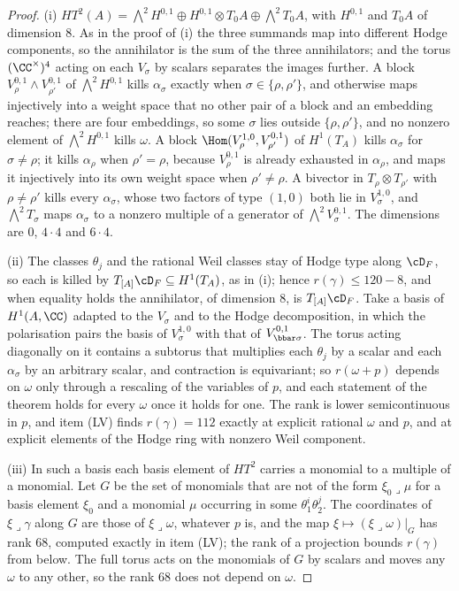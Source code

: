 \begin{proof}
(i) $HT^{2}(A)=\bigwedge^{2}H^{0,1}\oplus H^{0,1}\otimes T_{0}A\oplus
\bigwedge^{2}T_{0}A$, with $H^{0,1}$ and $T_{0}A$ of dimension $8$. As in the
proof of (i) the three summands map into different Hodge
components, so the annihilator is the sum of the three annihilators; and the
torus $(\CC^{\times})^{4}$ acting on each $V_{\sigma}$ by scalars separates the
images further. A block $V_{\rho}^{0,1}\wedge V_{\rho'}^{0,1}$ of
$\bigwedge^{2}H^{0,1}$ kills $\alpha_{\sigma}$ exactly when
$\sigma\in\{\rho,\rho'\}$, and otherwise maps injectively into a weight space
that no other pair of a block and an embedding reaches; there are four
embeddings, so some $\sigma$ lies outside $\{\rho,\rho'\}$, and no nonzero
element of $\bigwedge^{2}H^{0,1}$ kills $\omega$. A block
$\Hom(V_{\rho}^{1,0},V_{\rho'}^{0,1})$ of $H^{1}(T_{A})$ kills $\alpha_{\sigma}$
for $\sigma\ne\rho$; it kills $\alpha_{\rho}$ when $\rho'=\rho$, because
$V_{\rho}^{0,1}$ is already exhausted in $\alpha_{\rho}$, and maps it
injectively into its own weight space when $\rho'\ne\rho$. A bivector in
$T_{\rho}\otimes T_{\rho'}$ with $\rho\ne\rho'$ kills every $\alpha_{\sigma}$,
whose two factors of type $(1,0)$ both lie in $V_{\sigma}^{1,0}$, and
$\bigwedge^{2}T_{\sigma}$ maps $\alpha_{\sigma}$ to a nonzero multiple of a
generator of $\bigwedge^{2}V_{\sigma}^{0,1}$. The dimensions are $0$,
$4\cdot4$ and $6\cdot4$.

(ii) The classes $\theta_{j}$ and the rational Weil classes stay of Hodge type
along $\cD_{F}$, so each is killed by $T_{[A]}\cD_{F}\subseteq H^{1}(T_{A})$, as
in (i); hence $r(\gamma)\le120-8$, and when equality
holds the annihilator, of dimension $8$, is $T_{[A]}\cD_{F}$. Take a basis of
$H^{1}(A,\CC)$ adapted to the $V_{\sigma}$ and to the Hodge decomposition, in
which the polarisation pairs the basis of $V_{\sigma}^{1,0}$ with that of
$V_{\bbar\sigma}^{0,1}$. The torus acting diagonally on it contains a subtorus
that multiplies each $\theta_{j}$ by a scalar and each $\alpha_{\sigma}$ by an
arbitrary scalar, and contraction is equivariant; so $r(\omega+p)$ depends on
$\omega$ only through a rescaling of the variables of $p$, and each statement
of the theorem holds for every $\omega$ once it holds for one. The rank is
lower semicontinuous in $p$, and item (LV) finds $r(\gamma)=112$ exactly at
explicit rational $\omega$ and $p$, and at explicit elements of the Hodge ring
with nonzero Weil component.

(iii) In such a basis each basis element of $HT^{2}$ carries a monomial to a
multiple of a monomial. Let $G$ be the set of monomials that are not of the
form $\xi_{0}\lrcorner\mu$ for a basis element $\xi_{0}$ and a monomial $\mu$
occurring in some $\theta_{1}^{i}\theta_{2}^{j}$. The coordinates of
$\xi\lrcorner\gamma$ along $G$ are those of $\xi\lrcorner\omega$, whatever $p$
is, and the map $\xi\mapsto(\xi\lrcorner\omega)|_{G}$ has rank $68$, computed
exactly in item (LV); the rank of a projection bounds $r(\gamma)$ from below.
The full torus acts on the monomials of $G$ by scalars and moves any $\omega$
to any other, so the rank $68$ does not depend on $\omega$.


\end{proof}

